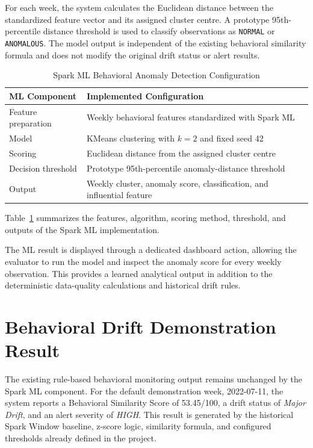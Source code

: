\documentclass[12pt,a4paper]{report}
\begin{document}
For each week, the system calculates the Euclidean distance between the standardized feature vector and its assigned cluster centre. A prototype 95th-percentile distance threshold is used to classify observations as \texttt{NORMAL} or \texttt{ANOMALOUS}. The model output is independent of the existing behavioral similarity formula and does not modify the original drift status or alert results.

\begin{table}[H]
\centering
\renewcommand{\arraystretch}{1.2}
\begin{tabular}{|p{5.0cm}|p{7.2cm}|}
\hline
\textbf{ML Component} & \textbf{Implemented Configuration}\\
\hline
Feature preparation & Weekly behavioral features standardized with Spark ML\\
\hline
Model & KMeans clustering with $k=2$ and fixed seed 42\\
\hline
Scoring & Euclidean distance from the assigned cluster centre\\
\hline
Decision threshold & Prototype 95th-percentile anomaly-distance threshold\\
\hline
Output & Weekly cluster, anomaly score, classification, and influential feature\\
\hline
\end{tabular}
\caption{Spark ML Behavioral Anomaly Detection Configuration}
\label{tab:spark_ml_configuration}
\end{table}

Table~\ref{tab:spark_ml_configuration} summarizes the features, algorithm, scoring method, threshold, and outputs of the Spark ML implementation.

The ML result is displayed through a dedicated dashboard action, allowing the evaluator to run the model and inspect the anomaly score for every weekly observation. This provides a learned analytical output in addition to the deterministic data-quality calculations and historical drift rules.

\section{Behavioral Drift Demonstration Result}

The existing rule-based behavioral monitoring output remains unchanged by the Spark ML component. For the default demonstration week, 2022-07-11, the system reports a Behavioral Similarity Score of 53.45/100, a drift status of \textit{Major Drift}, and an alert severity of \textit{HIGH}. This result is generated by the historical Spark Window baseline, z-score logic, similarity formula, and configured thresholds already defined in the project.
\end{document}
